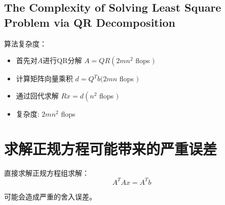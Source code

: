 \subsection{The Complexity of Solving Least Square Problem via QR Decomposition}
\label{complexity:least-square-using-qr}

算法复杂度：

\begin{itemize}
    \item 首先对$A$进行QR分解 $ A=Q R\left(2 m n^{2}\right. $ flops $ ) $
    \item 计算矩阵向量乘积 $ d=Q^{T} b(2 {mn} $ flops $ ) $
    \item 通过回代求解 $ R x=d\left(n^{2}\right. $ flops $ ) $
    \item 复杂度: $ 2 m n^{2} $ flops
\end{itemize}



\section{求解正规方程可能带来的严重误差}

直接求解正规方程组求解：
\begin{equation}
A^{T} A x=A^{T} b
\end{equation}

可能会造成严重的舍入误差。

